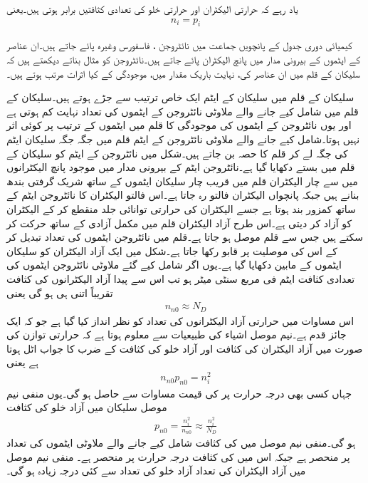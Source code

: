 یاد رہے کہ حرارتی الیکٹران اور حرارتی خلو کی تعدادی کثافتیں برابر ہوتی ہیں۔یعنی
\begin{align}
n_i = p_i
\end{align}

کیمیائی دوری جدول کے پانچویں جماعت میں نائٹروجن ، فاسفورس   وغیرہ پائے جاتے ہیں۔ان عناصر کے ایٹموں کے بیرونی مدار میں پانچ الیکٹران پائے جاتے ہیں۔نائٹروجن کو مثال بناتے دیکھتے ہیں کہ سلیکان کے قلم میں ان عناصر کی، نہایت باریک مقدار میں، موجودگی کے کیا اثرات مرتب ہوتے ہیں۔

سلیکان کے قلم میں سلیکان کے ایٹم ایک خاص ترتیب سے جڑے ہوتے ہیں۔سلیکان کے قلم میں شامل کیے جانے والے ملاوٹی نائٹروجن کے ایٹموں کی تعداد   نہایت کم ہوتی ہے اور یوں نائٹروجن کے ایٹموں کی موجودگی کا قلم میں ایٹموں کے ترتیب پر کوئی اثر نہیں ہوتا۔شامل کیے جانے والے ملاوٹی  نائٹروجن کے ایٹم قلم میں جگہ جگہ سلیکان ایٹم کی جگہ لے کر  قلم  کا حصہ بن جاتے ہیں۔شکل   میں نائٹروجن کے ایٹم کو سلیکان کے قلم میں بستے دکھایا گیا ہے۔نائٹروجن ایٹم کے بیرونی مدار میں موجود پانچ الیکٹرانوں میں سے چار الیکٹران قلم میں قریب چار سلیکان ایٹموں کے ساتھ شریک گرفتی بندھ بنانے ہیں جبکہ پانچواں الیکٹران فالتو رہ جاتا ہے۔اس فالتو الیکٹران کا نائٹروجن ایٹم کے ساتھ کمزور بند  ہوتا ہے جسے الیکٹران کی حرارتی توانائی جلد منقطع کر کے الیکٹران کو آزاد کر دیتی ہے۔اس طرح آزاد الیکٹران قلم میں مکمل آزادی کے ساتھ حرکت کر سکتے ہیں جس سے قلم موصل ہو جاتا ہے۔قلم میں نائٹروجن ایٹموں کی تعداد تبدیل کر کے اس کی موصلیت پر قابو رکھا جاتا ہے۔شکل   میں ایک آزاد الیکٹران  کو سلیکان ایٹموں کے مابین دکھایا گیا ہے۔یوں اگر شامل کیے گئے ملاوٹی نائٹروجن ایٹموں کی تعدادی کثافت  ایٹم فی مربع سنٹی میٹر ہو تب اس سے پیدا آزاد الیکٹرانوں کی کثافت  تقریباً اتنی ہی ہو گی یعنی
\begin{align}
n_{n0} \approx N_D
\end{align}
اس مساوات میں حرارتی آزاد الیکٹرانوں کی تعداد کو نظر انداز کیا گیا ہے جو کہ ایک جائز قدم ہے۔نیم موصل اشیاء کی طبیعیات سے معلوم ہوتا ہے کہ حرارتی توازن کی صورت میں آزاد الیکٹران کی کثافت   اور آزاد خلو کی کثافت   کے ضرب کا جواب اٹل ہوتا ہے یعنی
\begin{align} \label{مساوات_ڈایوڈ_حرارتی_توازن_میں_اٹل_تعدادی_کثافتیں}
n_{n0} p_{n0} = n_i^{2}
\end{align}
جہاں کسی بھی درجہ حرارت پر  کی قیمت مساوات   سے حاصل ہو گی۔یوں منفی نیم موصل سلیکان میں آزاد خلو کی کثافت
\begin{align}
p_{n0} = \frac{n_i^2}{n_{n0}} \approx \frac{n_i^2}{N_D}
\end{align}
ہو گی۔منفی نیم موصل میں  کی کثافت شامل کیے جانے والے ملاوٹی ایٹموں کی تعداد پر منحصر ہے جبکہ اس میں  کی کثافت درجہ حرارت پر منحصر ہے۔ منفی نیم موصل میں آزاد الیکٹران کی تعداد آزاد خلو کی تعداد سے کئی درجہ زیادہ ہو گی۔

